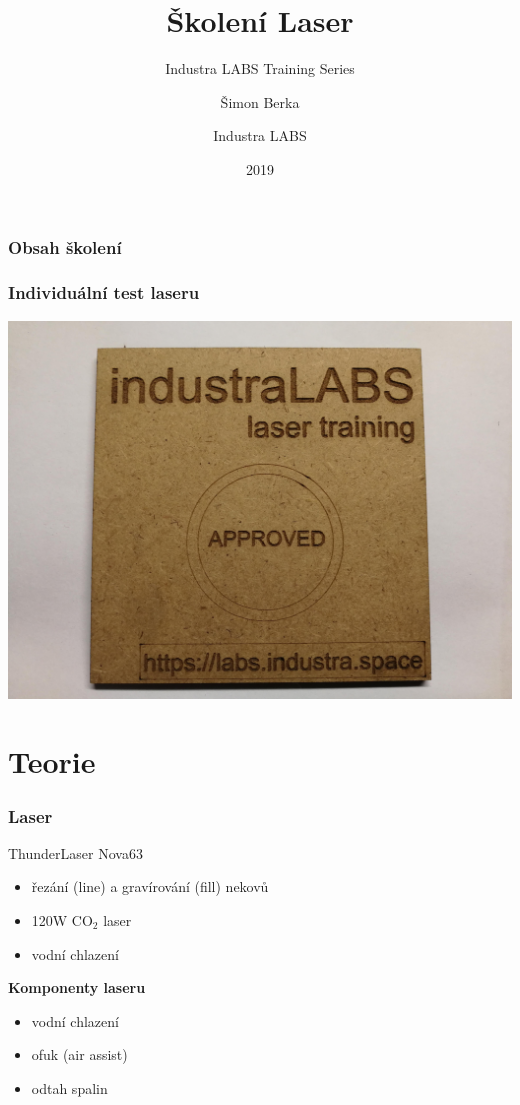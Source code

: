 \documentclass[14pt]{beamer}
\title[Školení Laser] %
{Školení Laser}
\subtitle{Industra LABS Training Series}
\author[Šimon Berka] %
{Šimon Berka\inst{1} \and Industra LABS\inst{2}}
\date[2019] %
{2019}
\begin{document}
\frame{\titlepage}


\begin{frame}
\frametitle{Obsah školení}
\tableofcontents
\end{frame}

\begin{frame}
\frametitle{Individuální test laseru}
\centering
\includegraphics[scale=0.06]{imgs/approved.jpg}
\end{frame}

\section{Teorie}

\begin{frame}
\frametitle{Laser}

\begin{block}{ThunderLaser Nova63}
\begin{itemize}
\item řezání (line) a gravírování (fill) nekovů
\item 120W CO$_{2}$ laser
\item vodní chlazení
\end{itemize}
\end{block}

\textbf{Komponenty laseru}
\begin{itemize}
	\item vodní chlazení
	\item ofuk (air assist)
	\item odtah spalin
	
\end{itemize}
\end{frame}
\end{document}
